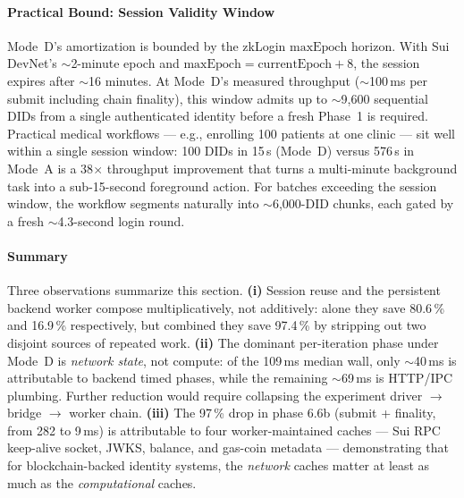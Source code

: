 \paragraph{Practical Bound: Session Validity Window}
\label{sec:session-reuse-window}

Mode~D's amortization is bounded by the zkLogin
\(\text{maxEpoch}\) horizon. With Sui DevNet's
\(\sim\)2-minute epoch and \(\text{maxEpoch} = \text{currentEpoch} +
8\), the session expires after \(\sim\)16 minutes. At Mode~D's measured
throughput (\(\sim\)100\,ms per submit including chain finality), this
window admits up to \(\sim\)9{,}600 sequential DIDs from a single
authenticated identity before a fresh Phase~1 is required. Practical
medical workflows — e.g., enrolling 100 patients at one clinic — sit
well within a single session window: 100 DIDs in 15\,s (Mode~D) versus
576\,s in Mode~A is a 38$\times$ throughput improvement that turns a
multi-minute background task into a sub-15-second foreground action.
For batches exceeding the session window, the workflow segments
naturally into \(\sim\)6{,}000-DID chunks, each gated by a fresh
$\sim$4.3-second login round.

\paragraph{Summary}

Three observations summarize this section.
\textbf{(i)} Session reuse and the persistent backend worker compose
multiplicatively, not additively: alone they save 80.6\,\% and 16.9\,\%
respectively, but combined they save 97.4\,\% by stripping out two
disjoint sources of repeated work.
\textbf{(ii)} The dominant per-iteration phase under Mode~D is
\emph{network state}, not compute: of the 109\,ms median wall, only
\(\sim\)40\,ms is attributable to backend timed phases, while the
remaining \(\sim\)69\,ms is HTTP/IPC plumbing. Further reduction would
require collapsing the experiment driver $\to$ bridge $\to$ worker
chain.
\textbf{(iii)} The 97\,\% drop in phase 6.6b (submit + finality, from
282 to 9\,ms) is attributable to four worker-maintained caches — Sui
RPC keep-alive socket, JWKS, balance, and gas-coin metadata —
demonstrating that for blockchain-backed identity systems, the
\emph{network} caches matter at least as much as the
\emph{computational} caches.
